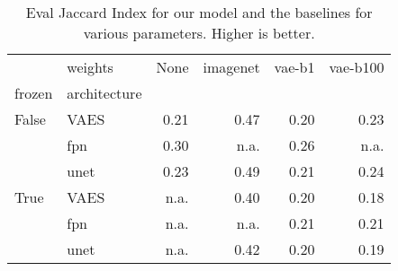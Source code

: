 \begin{table}[ht]
\centering
\caption{Eval Jaccard Index for our model and the baselines for various parameters. Higher is better.}
\label{tab:baseline_results}
\begin{tabular}{llrrrr}
\toprule
     & weights &  None &  imagenet &  vae-b1 &  vae-b100 \\
frozen & architecture &       &           &         &           \\
\midrule
False & VAES &  0.21 &      0.47 &    0.20 &      0.23 \\
     & fpn &  0.30 &      n.a. &    0.26 &      n.a. \\
     & unet &  0.23 &      0.49 &    0.21 &      0.24 \\
True & VAES &  n.a. &      0.40 &    0.20 &      0.18 \\
     & fpn &  n.a. &      n.a. &    0.21 &      0.21 \\
     & unet &  n.a. &      0.42 &    0.20 &      0.19 \\
\bottomrule
\end{tabular}
\end{table}
